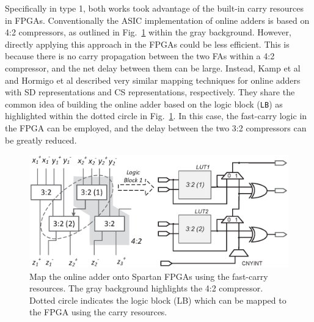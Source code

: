 \documentclass[conference]{IEEEtran}
\begin{document}
Specifically in type 1, both works took advantage of the built-in carry resources in FPGAs. Conventionally the ASIC implementation of online adders is based on 4:2 compressors, as outlined in Fig.~\ref{Fig:PreviousWork} within the gray background. However, directly applying this approach in the FPGAs could be less efficient. This is because there is no carry propagation between the two FAs within a 4:2 compressor, and the net delay between them can be large. Instead, Kamp et al \cite{FPT09RA} and Hormigo et al \cite{ASAP09RA} described very similar mapping techniques for online adders with SD representations and CS representations, respectively. They share the common idea of building the online adder based on the logic block (\texttt{LB}) as highlighted within the dotted circle in Fig.~\ref{Fig:PreviousWork}. In this case, the fast-carry logic in the FPGA can be employed, and the delay between the two 3:2 compressors can be greatly reduced.
%
\begin{figure}[tbp]
	\centering
	\includegraphics[width=.47\textwidth]{./Figures/SDAdder_42comp_Spartan.eps}
  \vspace{-1ex}
	\caption{Map the online adder onto Spartan FPGAs using the fast-carry resources. The gray background highlights the 4:2 compressor. Dotted circle indicates the logic block (LB) which can be mapped to the FPGA using the carry resources.}
	\vspace{-4ex}
	\label{Fig:PreviousWork}
\end{figure}
\end{document}
